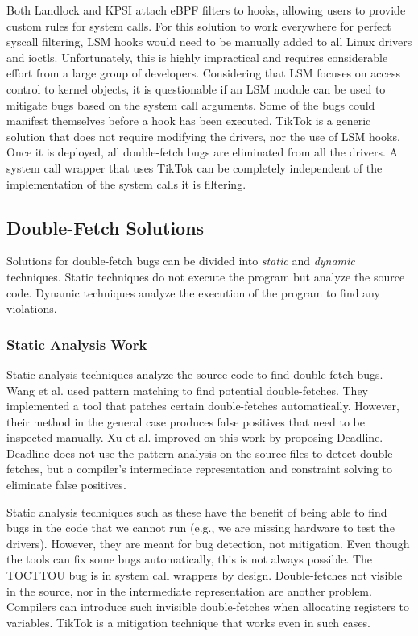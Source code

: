 Both Landlock and KPSI attach eBPF filters to hooks, allowing users to provide
custom rules for system calls. For this solution to work everywhere for perfect
syscall filtering, LSM hooks would need to be manually added to all Linux
drivers and ioctls. Unfortunately, this is highly impractical and requires
considerable effort from a large group of developers. Considering that LSM
focuses on access control to kernel objects, it is questionable if an LSM module
can be used to mitigate bugs based on the system call arguments. Some of the
bugs could manifest themselves before a hook has been executed. TikTok is a
generic solution that does not require modifying the drivers, nor the use of
LSM hooks. Once it is deployed, all double-fetch bugs are eliminated from all
the drivers. A system call wrapper that uses TikTok can be completely
independent of the implementation of the system calls it is filtering.

\subsection{Double-Fetch Solutions}

Solutions for double-fetch bugs can be divided into \emph{static} and
\emph{dynamic} techniques. Static techniques do not execute the program but
analyze the source code. Dynamic techniques analyze the execution of the
program to find any violations.

\subsubsection{Static Analysis Work}
\label{subsec:dfstatic}
Static analysis techniques analyze the source code to find double-fetch bugs.
Wang et al. \cite{wang2017double} used pattern matching to find potential
double-fetches. They implemented a tool that patches certain double-fetches
automatically. However, their method in the general case produces false
positives that need to be inspected manually. Xu et al.\cite{xu2018precise}
improved on this work by proposing Deadline. Deadline does not use the pattern 
analysis on the source files to detect double-fetches, but a compiler's
intermediate representation and constraint solving to eliminate false positives.

Static analysis techniques such as these have the benefit of being able to find
bugs in the code that we cannot run (e.g., we are missing hardware to test the
drivers). However, they are meant for bug detection, not mitigation. Even though
the tools can fix some bugs automatically, this is not always possible. The
TOCTTOU bug is in system call wrappers by design. Double-fetches not visible in
the source, nor in the intermediate representation are another problem.
Compilers can introduce such invisible double-fetches when allocating registers
to variables. TikTok is a mitigation technique that works even in such cases.


